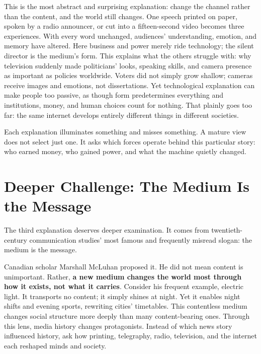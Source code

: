 This is the most abstract and surprising explanation: change the channel rather than the content, and the world still changes. One speech printed on paper, spoken by a radio announcer, or cut into a fifteen-second video becomes three experiences. With every word unchanged, audiences' understanding, emotion, and memory have altered. Here business and power merely ride technology; the silent director is the medium's form. This explains what the others struggle with: why television suddenly made politicians' looks, speaking skills, and camera presence as important as policies worldwide. Voters did not simply grow shallow; cameras receive images and emotions, not dissertations. Yet technological explanation can make people too passive, as though form predetermines everything and institutions, money, and human choices count for nothing. That plainly goes too far: the same internet develops entirely different things in different societies.

Each explanation illuminates something and misses something. A mature view does not select just one. It asks which forces operate behind this particular story: who earned money, who gained power, and what the machine quietly changed.

\section[The Medium Is the Message]{Deeper Challenge: The Medium Is the Message}
The third explanation deserves deeper examination. It comes from twentieth-century communication studies' most famous and frequently misread slogan: the medium is the message.

Canadian scholar Marshall McLuhan proposed it. He did not mean content is unimportant. Rather, \textbf{a new medium changes the world most through how it exists, not what it carries}. Consider his frequent example, electric light. It transports no content; it simply shines at night. Yet it enables night shifts and evening sports, rewriting cities' timetables. This contentless medium changes social structure more deeply than many content-bearing ones. Through this lens, media history changes protagonists. Instead of which news story influenced history, ask how printing, telegraphy, radio, television, and the internet each reshaped minds and society.

